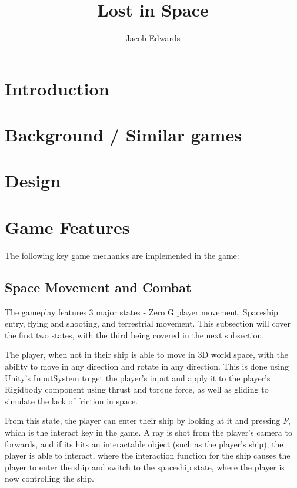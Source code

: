 \documentclass[final]{cmpreport}
\title{Lost in Space}
\author{Jacob Edwards}
\begin{document}
    \section{Introduction}\label{sec:introduction}

    \section{Background / Similar games}\label{sec:background}

    \section{Design}\label{sec:design}

    \section{Game Features}\label{sec:features}

    The following key game mechanics are implemented in the game:

    \subsection{Space Movement and Combat}\label{subsec:movement}

    The gameplay features 3 major states - Zero G player movement, Spaceship entry, flying and shooting, and terrestrial
    movement.
    This subsection will cover the first two states, with the third being covered in the next subsection.

    The player, when not in their ship is able to move in 3D world space, with the ability to move in any direction and
    rotate in any direction.
    This is done using Unity's InputSystem\citep{unity:inputsystem} to get the player's input and apply it to the player's
    Rigidbody component\citep{unity:rigidbody} using thrust and torque force, as well as gliding to simulate the lack of
    friction in space.

    From this state, the player can enter their ship by looking at it and pressing \textit{F}, which is the interact
    key in the game.
    A ray is shot from the player's camera to forwards, and if its hits an interactable object (such as the player's ship),
    the player is able to interact, where the interaction function for the ship causes the player to enter the ship and
    switch to the spaceship state, where the player is now controlling the ship.
\end{document}

